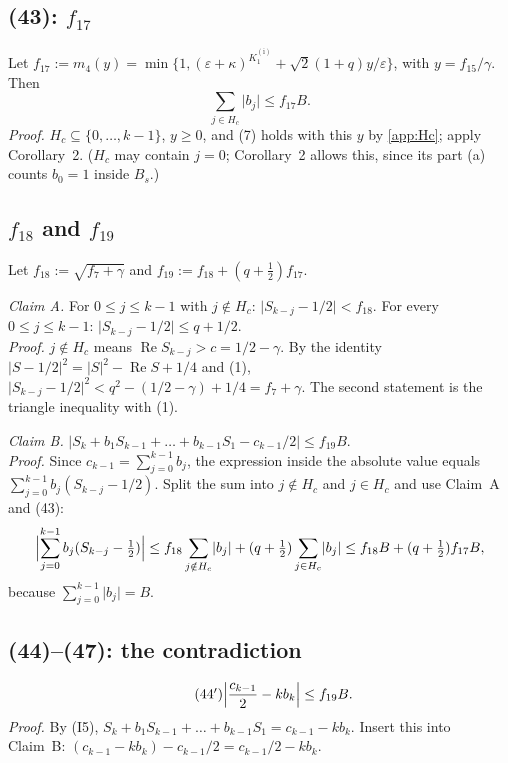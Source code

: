 \documentclass[11pt]{amsart}
\theoremstyle{remark}
\theoremstyle{plain}
\newcommand{\abs}[1]{\lvert #1\rvert}
\newcommand{\eps}{\varepsilon}
\DeclareMathOperator{\re}{Re}
\newcommand{\Ka}{K_1^{(\mathrm{i})}}
\begin{document}
\subsection{(43): \texorpdfstring{$f_{17}$}{f17}}\label{app:43}
Let $f_{17}:=m_4(y)=\min\{1,(\eps+\kappa)^{\Ka}+\sqrt2(1+q)y/\eps\}$, with $y=f_{15}/\gamma$. Then
\begin{equation}\tag{43}
\sum_{j\in H_c}\abs{b_j}\le f_{17}B .
\end{equation}
\emph{Proof.} $H_c\subseteq\{0,\dots,k-1\}$, $y\ge0$, and (7) holds with this $y$ by \ref{app:Hc}; apply Corollary~2. ($H_c$ may contain $j=0$; Corollary~2 allows this, since its part (a) counts $b_0=1$ inside $B_s$.)

\subsection{\texorpdfstring{$f_{18}$ and $f_{19}$}{f18 and f19}}\label{app:f19}
Let $f_{18}:=\sqrt{f_7+\gamma}$ and $f_{19}:=f_{18}+(q+\frac12)f_{17}$.

\emph{Claim A.} For $0\le j\le k-1$ with $j\notin H_c$: $\abs{S_{k-j}-1/2}<f_{18}$. For every $0\le j\le k-1$: $\abs{S_{k-j}-1/2}\le q+1/2$. \\
\emph{Proof.} $j\notin H_c$ means $\re S_{k-j}>c=1/2-\gamma$. By the identity $\abs{S-1/2}^2=\abs S^2-\re S+1/4$ and (1), $\abs{S_{k-j}-1/2}^2<q^2-(1/2-\gamma)+1/4=f_7+\gamma$. The second statement is the triangle inequality with (1).

\emph{Claim B.} $\bigl|S_k+b_1S_{k-1}+\dots+b_{k-1}S_1-c_{k-1}/2\bigr|\le f_{19}B$. \\
\emph{Proof.} Since $c_{k-1}=\sum_{j=0}^{k-1}b_j$, the expression inside the absolute value equals $\sum_{j=0}^{k-1}b_j(S_{k-j}-1/2)$. Split the sum into $j\notin H_c$ and $j\in H_c$ and use Claim~A and (43):
\[
\Bigl|\sum_{j=0}^{k-1}b_j(S_{k-j}-\tfrac12)\Bigr|\le f_{18}\sum_{j\notin H_c}\abs{b_j}+(q+\tfrac12)\sum_{j\in H_c}\abs{b_j}\le f_{18}B+(q+\tfrac12)f_{17}B,
\]
because $\sum_{j=0}^{k-1}\abs{b_j}=B$.

\subsection{(44)--(47): the contradiction}\label{app:final}
\begin{equation}\tag{44$'$}
\Bigl|\frac{c_{k-1}}2-kb_k\Bigr|\le f_{19}B .
\end{equation}
\emph{Proof.} By (I5), $S_k+b_1S_{k-1}+\dots+b_{k-1}S_1=c_{k-1}-kb_k$. Insert this into Claim~B: $(c_{k-1}-kb_k)-c_{k-1}/2=c_{k-1}/2-kb_k$.
\end{document}

